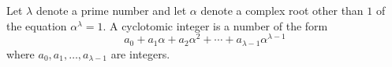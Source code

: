 Let $\lambda$ denote a prime number and let $\alpha$ denote a complex root other than $1$ of the equation $\alpha^{\lambda} = 1$. A cyclotomic integer is a number of the form
$$a_0 + a_1\alpha + a_2\alpha^2 + \cdots + a_{\lambda-1}\alpha^{\lambda-1}$$
where $a_0, a_1, \ldots, a_{\lambda-1}$ are integers.
